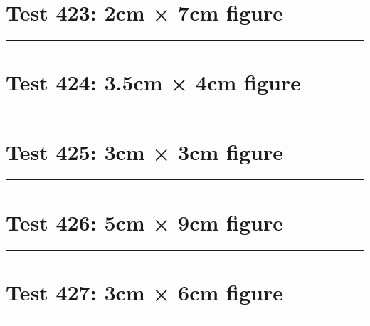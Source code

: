 \documentclass[a4paper,11pt]{article}
\begin{document}
\section*{Test 423: 2cm × 7cm figure}
\begin{swarmwrap}%
  \begin{minipage}[t]{2cm}
    \centering
    \rule{\linewidth}{7cm}
  \end{minipage}%
\end{swarmwrap}%
\swarmwrapnext
\lipsum[148]
\lipsum[149]
\lipsum[150]
\lipsum[1]
\section*{Test 424: 3.5cm × 4cm figure}
\begin{swarmwrap}%
  \begin{minipage}[t]{3cm}
    \centering
    \rule{\linewidth}{4cm}
  \end{minipage}%
\end{swarmwrap}%
\swarmwrapnext
\lipsum[136]
\lipsum[137]
\lipsum[138]
\section*{Test 425: 3cm × 3cm figure}
\begin{swarmwrap}%
  \begin{minipage}[t]{3cm}
    \centering
    \rule{\linewidth}{3cm}
  \end{minipage}%
\end{swarmwrap}%
\swarmwrapnext
\lipsum[101]
\lipsum[102]
\lipsum[103]
\section*{Test 426: 5cm × 9cm figure}
\begin{swarmwrap}%
  \begin{minipage}[t]{5cm}
    \centering
    \rule{\linewidth}{9cm}
  \end{minipage}%
\end{swarmwrap}%
\swarmwrapnext
\lipsum[101]
\lipsum[102]
\lipsum[103]
\section*{Test 427: 3cm × 6cm figure}
\begin{swarmwrap}%
  \begin{minipage}[t]{3cm}
    \centering
    \rule{\linewidth}{6cm}
  \end{minipage}%
\end{swarmwrap}%
\swarmwrapnext
\lipsum[93]
\lipsum[94]
\lipsum[95]
\end{document}
